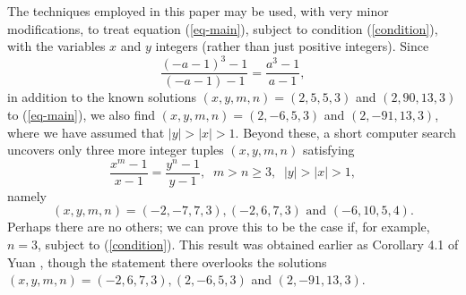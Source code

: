 The techniques employed in this paper may be used, with very minor modifications, to treat equation (\ref{eq-main}), subject to condition (\ref{condition}), with the variables $x$ and $y$ integers (rather than just positive integers). Since 
$$
\frac{(-a-1)^3-1}{(-a-1)-1} = \frac{a^3-1}{a-1},
$$
in addition to the known solutions $(x,y,m,n)=(2,5,5,3)$ and $(2,90,13,3)$ to (\ref{eq-main}),
we also find  $(x,y,m,n)=(2,-6,5,3)$ and $(2,-91,13,3)$, where we have assumed that $|y|>|x|>1$.
Beyond these, a short computer search uncovers only three more integer tuples $(x,y,m,n)$ satisfying
$$
\frac{x^m-1}{x-1} = \frac{y^n-1}{y-1}, \; \; m > n \geq 3, \; \; |y| > |x| >1,
$$
namely
$$
(x,y,m,n)=(-2,-7,7,3), (-2,6,7,3) \mbox{ and }  (-6,10,5,4).
$$
Perhaps there are no others; we can prove this to be the case if, for example, $n=3$, subject to (\ref{condition}). This result was obtained earlier as Corollary 4.1 of Yuan \cite{Yu0}, though the statement there overlooks the solutions $(x,y,m,n)= (-2,6,7,3), (2,-6,5,3)$ and $(2,-91,13,3)$.



\endinput

I'd like to thank the Elysian Room and Pallet Coffee for not kicking me out of their establishments during the arduous writing process, and my lovely lounge chair for (literally) supporting me after closing hours. 


Any text after an \endinput is ignored.
You could put scraps here or things in progress.

